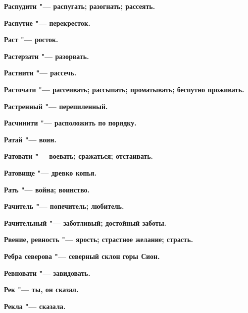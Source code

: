 \begin{mymulticols}{2}
\bfseries Распудити\normalfont{} "--- распугать; разогнать; рассеять. 




\bfseries Распутие\normalfont{} "--- перекресток. 




\bfseries Раст\normalfont{} "--- росток. 




\bfseries Растерзати\normalfont{} "--- разорвать. 




\bfseries Растнити\normalfont{} "--- рассечь. 




\bfseries Расточати\normalfont{} "--- рассеивать; рассыпать; проматывать; беспутно проживать. 




\bfseries Растренный\normalfont{} "--- перепиленный. 




\bfseries Расчинити\normalfont{} "--- расположить по порядку. 




\bfseries Ратай\normalfont{} "--- воин. 




\bfseries Ратовати\normalfont{} "--- воевать; сражаться; отстаивать. 




\bfseries Ратовище\normalfont{} "--- древко копья. 




\bfseries Рать\normalfont{} "--- война; воинство. 




\bfseries Рачитель\normalfont{} "--- попечитель; любитель. 




\bfseries Рачительный\normalfont{} "--- заботливый; достойный заботы. 




\bfseries Рвение, ревность\normalfont{} "--- ярость; страстное желание; страсть. 




\bfseries Ребра северова\normalfont{} "--- северный склон горы Сион. 




\bfseries Ревновати\normalfont{} "--- завидовать. 




\bfseries Рек\normalfont{} "--- ты, он сказал. 




\bfseries Рекла\normalfont{} "--- сказала. 





\end{mymulticols}

